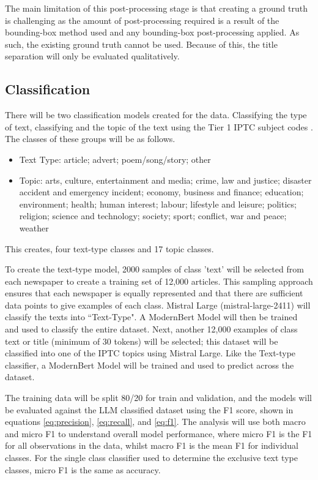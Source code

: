 \documentclass{article} %
\begin{document}
The main limitation of this post-processing stage is that creating a ground truth is challenging as the amount of post-processing required is a result of the bounding-box method used and any bounding-box post-processing applied. As such, the existing ground truth cannot be used. Because of this, the title separation will only be evaluated qualitatively.

\subsection{Classification}

There will be two classification models created for the data. Classifying the type of text, classifying and the topic of the text using the Tier 1 IPTC subject codes \cite{iptc_news_2019}. The classes of these groups will be as follows.

\begin{itemize}
    \item Text Type: article; advert; poem/song/story; other
    \item Topic: arts, culture, entertainment and media; crime, law and justice; disaster accident and emergency incident; economy, business and finance; education; environment; health; human interest; labour; lifestyle and leisure; politics; religion; science and technology; society; sport; conflict, war and peace; weather
\end{itemize}

This creates, four text-type classes and 17 topic classes. 
      
To create the text-type model, 2000 samples of class 'text' will be selected from each newspaper to create a training set of 12,000 articles. This sampling approach ensures that each newspaper is equally represented and that there are sufficient data points to give examples of each class. Mistral Large (mistral-large-2411) will classify the texts into ``Text-Type". A ModernBert Model \cite{warner_smarter_2024} will then be trained and used to classify the entire dataset. Next, another 12,000 examples of class text or title (minimum of 30 tokens) will be selected; this dataset will be classified into one of the IPTC topics using Mistral Large. Like the Text-type classifier, a ModernBert Model will be trained and used to predict across the dataset. 

The training data will be split 80/20 for train and validation, and the models will be evaluated against the LLM classified dataset using the F1 score, shown in equations \ref{eq:precision}, \ref{eq:recall}, and \ref{eq:f1}. The analysis will use both macro and micro F1 to understand overall model performance, where micro F1 is the F1 for all observations in the data, whilst macro F1 is the mean F1 for individual classes.
For the single class classifier used to determine the exclusive text type classes, micro F1 is the same as accuracy. 
\end{document}
